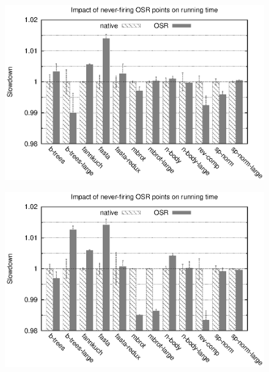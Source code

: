 \ifdefined\noauthorea
\begin{figure}[t]
\begin{center}
\includegraphics[width=0.95\columnwidth]{figures/code-quality-noBB/code-quality-noBB.eps}
\caption{\label{fig:code-quality-base} \protect}
\end{center}
\end{figure}
\fi

\ifdefined\noauthorea
\begin{figure}[t]
\begin{center}
\includegraphics[width=0.95\columnwidth]{figures/code-quality-O1-noBB/code-quality-O1-noBB.eps}
\caption{\label{fig:code-quality-O1} \protect}
\end{center}
\end{figure}
\fi

\ifauthorea{\newline}{}
